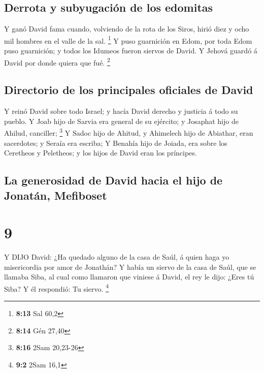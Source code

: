 \hypertarget{derrota-y-subyugaciuxf3n-de-los-edomitas}{%
\subsection{Derrota y subyugación de los
edomitas}\label{derrota-y-subyugaciuxf3n-de-los-edomitas}}

 Y ganó David fama cuando, volviendo de la rota de los
Siros, hirió diez y ocho mil hombres en el valle de la sal. \footnote{\textbf{8:13}
  Sal 60,2}  Y puso guarnición en Edom, por toda Edom puso
guarnición; y todos los Idumeos fueron siervos de David. Y Jehová guardó
á David por donde quiera que fué. \footnote{\textbf{8:14} Gén 27,40}

\hypertarget{directorio-de-los-principales-oficiales-de-david}{%
\subsection{Directorio de los principales oficiales de
David}\label{directorio-de-los-principales-oficiales-de-david}}

 Y reinó David sobre todo Israel; y hacía David derecho y
justicia á todo su pueblo.  Y Joab hijo de Sarvia era
general de su ejército; y Josaphat hijo de Ahilud, canciller;
\footnote{\textbf{8:16} 2Sam 20,23-26}  Y Sadoc hijo de
Ahitud, y Ahimelech hijo de Abiathar, eran sacerdotes; y Seraía era
escriba;  Y Benahía hijo de Joiada, era sobre los Ceretheos
y Peletheos; y los hijos de David eran los príncipes.

\hypertarget{la-generosidad-de-david-hacia-el-hijo-de-jonatuxe1n-mefiboset}{%
\subsection{La generosidad de David hacia el hijo de Jonatán,
Mefiboset}\label{la-generosidad-de-david-hacia-el-hijo-de-jonatuxe1n-mefiboset}}

\hypertarget{section-8}{%
\section{9}\label{section-8}}

 Y DIJO David: ¿Ha quedado alguno de la casa de Saúl, á
quien haga yo misericordia por amor de Jonathán?  Y había un
siervo de la casa de Saúl, que se llamaba Siba, al cual como llamaron
que viniese á David, el rey le dijo: ¿Eres tú Siba? Y él respondió: Tu
siervo. \footnote{\textbf{9:2} 2Sam 16,1}

